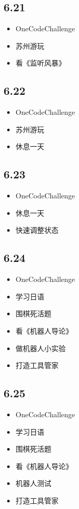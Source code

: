 \documentclass[UTF8]{ctexart}
\begin{document}
\subsection*{6.21}
\begin{itemize}
    \item OneCodeChallenge
    \item 苏州游玩
    \item 看《监听风暴》
\end{itemize}

\subsection*{6.22}
\begin{itemize}
    \item OneCodeChallenge
    \item 苏州游玩
    \item 休息一天
\end{itemize}

\subsection*{6.23}
\begin{itemize}
    \item OneCodeChallenge
    \item 休息一天
    \item 快速调整状态
\end{itemize}

\subsection*{6.24}
\begin{itemize}
    \item OneCodeChallenge
    \item 学习日语
    \item 围棋死活题
    \item 看《机器人导论》
    \item 做机器人小实验
    \item 打造工具管家
\end{itemize}

\subsection*{6.25}
\begin{itemize}
    \item OneCodeChallenge
    \item 学习日语
    \item 围棋死活题
    \item 看《机器人导论》
    \item 机器人测试
    \item 打造工具管家
\end{itemize}
\end{document}
